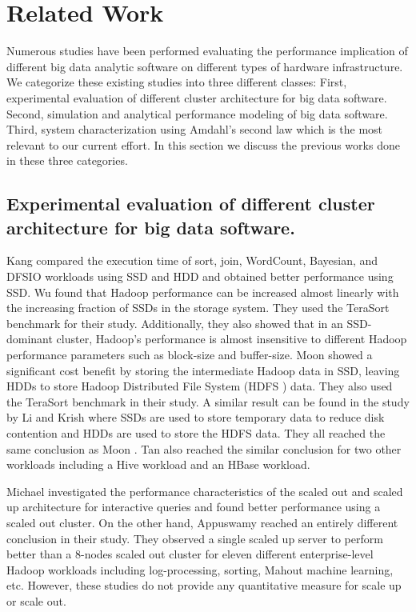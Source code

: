 \documentclass[journal]{IEEEtran}
\begin{document}
\section{Related Work}
Numerous studies have been performed evaluating the performance implication of different big data analytic software on different types of hardware infrastructure. We categorize these existing studies into three different classes: First,  experimental evaluation of different cluster architecture for big data software. Second,  simulation and analytical performance modeling of big data software. Third, system characterization using Amdahl's second law which is the most relevant to our current effort. In this section we discuss the previous works done in these three categories.

\subsection{Experimental evaluation of different cluster architecture for big data software.} 
Kang \cite{ssdhdd:kang} compared the execution time of sort, join, WordCount, Bayesian, and DFSIO workloads using SSD and HDD and obtained better performance using SSD. Wu \cite{ssdhdd:wu} found that Hadoop performance can be increased almost linearly with the increasing fraction of SSDs in the storage system. They used the TeraSort benchmark for their study. Additionally, they also showed that in an SSD-dominant cluster, Hadoop's performance is almost insensitive to different Hadoop performance parameters such as block-size and buffer-size. Moon \cite{ssdhdd:moon} showed a significant cost benefit by storing the intermediate Hadoop data in SSD, leaving HDDs to store Hadoop Distributed File System (HDFS \cite{fw:hdfs}) data. They also used the TeraSort benchmark in their study. A similar result can be found in the study by Li \cite{ssdhdd:li} and Krish \cite{ssdhdd:krish} where SSDs are used to store temporary data to reduce disk contention and HDDs are used to store the HDFS data. They all reached the same conclusion as Moon \cite{ssdhdd:moon}.  Tan \cite{ssdhdd:tan} also reached the similar conclusion for two other workloads including a Hive workload and an HBase workload. 

Michael \cite{scaleupscaleout:michael} investigated the performance characteristics of the scaled out and scaled up architecture for interactive queries and found better performance using a scaled out cluster. On the other hand, Appuswamy \cite{scaleupscaleout:appuswamy} reached an entirely different conclusion in their study. They observed a single scaled up server to perform better than a 8-nodes scaled out cluster for eleven different enterprise-level Hadoop workloads including log-processing, sorting, Mahout machine learning, etc. However, these studies do not provide any quantitative measure for scale up or scale out.  
\end{document}
